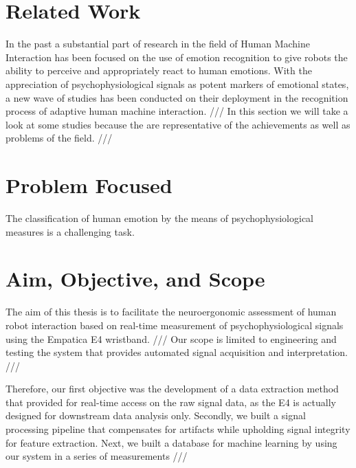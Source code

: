 
\section{Related Work}
In the past a substantial part of research in the field of Human Machine Interaction has been focused on the use of emotion recognition to give robots the ability to perceive and appropriately react to human emotions. With the appreciation of psychophysiological signals as potent markers of emotional states, a new wave of studies has been conducted on their deployment in the recognition process of adaptive human machine interaction.
///
In this section we will take a look at some studies because the are representative of the achievements as well as problems of the field.
///
 
\section{Problem Focused}
The classification of human emotion by the means of psychophysiological measures is a challenging task.
\section{Aim, Objective, and Scope}
The aim of this thesis is to facilitate the neuroergonomic assessment of human robot interaction based on real-time measurement of psychophysiological signals using the Empatica E4 wristband. 
///
Our scope is limited to engineering and testing the system that provides automated signal acquisition and interpretation. 
///

Therefore, our first objective was the development of a data extraction method that provided for real-time access on the raw signal data, as the E4 is actually designed for downstream data analysis only.
Secondly, we built a signal processing pipeline that compensates for artifacts while upholding signal integrity for feature extraction.
Next, we built a database for machine learning by using our system in a series of measurements  
///

